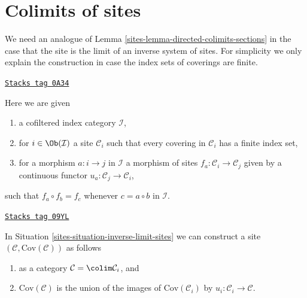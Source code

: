 \section{Colimits of sites}
\label{sites-section-colimit-sites}
We need an analogue of Lemma \ref{sites-lemma-directed-colimits-sections}
in the case that the site
is the limit of an inverse system of sites. For simplicity we only
explain the construction in case the index sets of coverings are finite.

\begin{definition}
\label{sites-situation-inverse-limit-sites}
\href{https://stacks.math.columbia.edu/tag/0A34}{\texttt{Stacks tag 0A34}}

Here we are given
\begin{enumerate}
\item a cofiltered index category $\mathcal{I}$,
\item for $i \in \Ob(\mathcal{I})$ a site $\mathcal{C}_i$ such that every
covering in $\mathcal{C}_i$ has a finite index set,
\item for a morphism $a : i \to j$ in $\mathcal{I}$ a morphism of sites
$f_a : \mathcal{C}_i \to \mathcal{C}_j$ given by a continuous functor
$u_a : \mathcal{C}_j \to \mathcal{C}_i$,
\end{enumerate}
such that $f_a \circ f_b = f_c$ whenever $c = a \circ b$ in $\mathcal{I}$.
\end{definition}

\begin{lemma}
\label{sites-lemma-colimit-sites}
\href{https://stacks.math.columbia.edu/tag/09YL}{\texttt{Stacks tag 09YL}}

In Situation \ref{sites-situation-inverse-limit-sites} we can construct
a site $(\mathcal{C}, \text{Cov}(\mathcal{C}))$ as follows
\begin{enumerate}
\item as a category $\mathcal{C} = \colim \mathcal{C}_i$, and
\item $\text{Cov}(\mathcal{C})$ is the union of the images
of $\text{Cov}(\mathcal{C}_i)$ by $u_i : \mathcal{C}_i \to \mathcal{C}$.
\end{enumerate}
\end{lemma}

